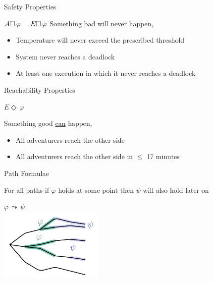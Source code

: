 \documentclass{beamer}
\begin{document}
\begin{slide}{Safety Properties}

        \begin{block}{$A \Box\, \varphi \hspace{0.5cm} E \Box\, \varphi$}
        Something bad will \alert{\underline{never}} happen, \eg\ 

\begin{itemize}
\item Temperature will never exceed the prescribed threshold
\item System never reaches a deadlock
\item At least one execution in which it never reaches a deadlock
\end{itemize}

\end{block}

\end{slide}

\begin{slide}{Reachability Properties}

\begin{block}{$E \Diamond\, \varphi$}

        Something good \alert{\underline{can}} happen, \eg\

	\begin{itemize}
                \item All adventurers reach the other side
                \item All adventurers reach the other side in $\leq$ 17 minutes
	\end{itemize}

\end{block}

\end{slide}


\begin{slide}{Path Formulae}

        For all paths if $\varphi$ holds at some point then $\psi$ will also
        hold later on

\small \centering

\begin{center}
        \Large $\varphi\, \leadsto\, \psi$ \\[2mm]
 \includegraphics[width=5cm]{./images/LeadsTo.jpg} 
 \end{center}

\end{slide}
\end{document}
